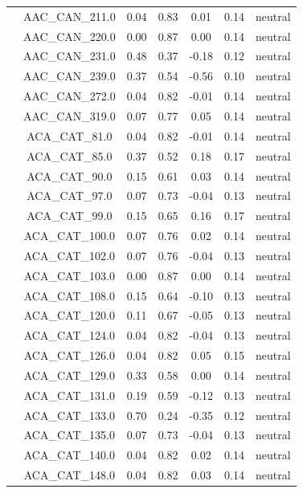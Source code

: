 \documentclass[11pt,]{article}
\begin{document}
\begin{longtable}[c]{@{}lcccccc@{}}
& AAC\_CAN\_211.0 & 0.04 & 0.83 & 0.01 & 0.14 & neutral
\\\addlinespace
& AAC\_CAN\_220.0 & 0.00 & 0.87 & 0.00 & 0.14 & neutral
\\\addlinespace
& AAC\_CAN\_231.0 & 0.48 & 0.37 & -0.18 & 0.12 & neutral
\\\addlinespace
& AAC\_CAN\_239.0 & 0.37 & 0.54 & -0.56 & 0.10 & neutral
\\\addlinespace
& AAC\_CAN\_272.0 & 0.04 & 0.82 & -0.01 & 0.14 & neutral
\\\addlinespace
& AAC\_CAN\_319.0 & 0.07 & 0.77 & 0.05 & 0.14 & neutral
\\\addlinespace
& ACA\_CAT\_81.0 & 0.04 & 0.82 & -0.01 & 0.14 & neutral
\\\addlinespace
& ACA\_CAT\_85.0 & 0.37 & 0.52 & 0.18 & 0.17 & neutral
\\\addlinespace
& ACA\_CAT\_90.0 & 0.15 & 0.61 & 0.03 & 0.14 & neutral
\\\addlinespace
& ACA\_CAT\_97.0 & 0.07 & 0.73 & -0.04 & 0.13 & neutral
\\\addlinespace
& ACA\_CAT\_99.0 & 0.15 & 0.65 & 0.16 & 0.17 & neutral
\\\addlinespace
& ACA\_CAT\_100.0 & 0.07 & 0.76 & 0.02 & 0.14 & neutral
\\\addlinespace
& ACA\_CAT\_102.0 & 0.07 & 0.76 & -0.04 & 0.13 & neutral
\\\addlinespace
& ACA\_CAT\_103.0 & 0.00 & 0.87 & 0.00 & 0.14 & neutral
\\\addlinespace
& ACA\_CAT\_108.0 & 0.15 & 0.64 & -0.10 & 0.13 & neutral
\\\addlinespace
& ACA\_CAT\_120.0 & 0.11 & 0.67 & -0.05 & 0.13 & neutral
\\\addlinespace
& ACA\_CAT\_124.0 & 0.04 & 0.82 & -0.04 & 0.13 & neutral
\\\addlinespace
& ACA\_CAT\_126.0 & 0.04 & 0.82 & 0.05 & 0.15 & neutral
\\\addlinespace
& ACA\_CAT\_129.0 & 0.33 & 0.58 & 0.00 & 0.14 & neutral
\\\addlinespace
& ACA\_CAT\_131.0 & 0.19 & 0.59 & -0.12 & 0.13 & neutral
\\\addlinespace
& ACA\_CAT\_133.0 & 0.70 & 0.24 & -0.35 & 0.12 & neutral
\\\addlinespace
& ACA\_CAT\_135.0 & 0.07 & 0.73 & -0.04 & 0.13 & neutral
\\\addlinespace
& ACA\_CAT\_140.0 & 0.04 & 0.82 & 0.02 & 0.14 & neutral
\\\addlinespace
& ACA\_CAT\_148.0 & 0.04 & 0.82 & 0.03 & 0.14 & neutral

\end{longtable}
\end{document}
